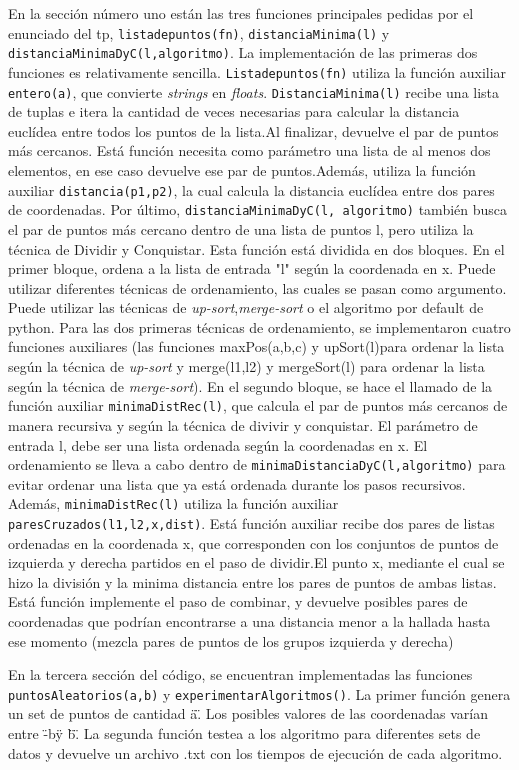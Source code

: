 \documentclass[12pt,a4paper]{article}
\begin{document}
En la sección número uno están las tres funciones principales pedidas por el enunciado del tp, \texttt{listadepuntos(fn)}, \texttt{distanciaMinima(l)} y \texttt{distanciaMinimaDyC(l,algoritmo)}. La implementación de las primeras dos funciones es relativamente sencilla. \texttt{Listadepuntos(fn)} utiliza la función auxiliar \texttt{entero(a)}, que convierte \textit{strings} en \textit{floats}. \texttt{DistanciaMinima(l)} recibe una lista de tuplas e itera la cantidad de veces necesarias para calcular la distancia euclídea entre todos los puntos de la lista.Al finalizar, devuelve el par de puntos más cercanos. Está función necesita como parámetro una lista de al menos dos elementos, en ese caso devuelve ese par de puntos.Además, utiliza la función auxiliar \texttt{distancia(p1,p2)}, la cual calcula la distancia euclídea entre dos pares de coordenadas. Por último, \texttt{distanciaMinimaDyC(l, algoritmo)} también busca el par de puntos más cercano dentro de una lista de puntos l, pero utiliza la técnica de Dividir y Conquistar. Esta función está dividida en dos bloques. En el primer bloque, ordena a la lista de entrada "l" según la coordenada en x. Puede utilizar diferentes técnicas de ordenamiento, las cuales se pasan como argumento. Puede utilizar las técnicas de \textit{up-sort},\textit{merge-sort} o el algoritmo por default de python. Para las dos primeras técnicas de ordenamiento, se implementaron cuatro funciones auxiliares (las funciones maxPos(a,b,c) y upSort(l)para ordenar la lista según la técnica de \textit{up-sort} y  merge(l1,l2) y mergeSort(l) para ordenar la lista según la técnica de \textit{merge-sort}). En el segundo bloque, se hace el llamado de la función auxiliar \texttt{minimaDistRec(l)}, que calcula el par de puntos más cercanos de manera recursiva y según la técnica de divivir y conquistar. El parámetro de entrada l, debe ser una lista ordenada según la coordenadas en x. El ordenamiento se lleva a cabo dentro de \texttt{minimaDistanciaDyC(l,algoritmo)} para evitar ordenar una lista que ya está ordenada durante los pasos recursivos. Además, \texttt{minimaDistRec(l)} utiliza la función auxiliar \texttt{paresCruzados(l1,l2,x,dist)}. Está función auxiliar recibe dos pares de listas ordenadas en la coordenada x, que corresponden con los conjuntos de puntos de izquierda y derecha partidos en el paso de dividir.El punto x, mediante el cual se hizo la división y la minima distancia entre los pares de puntos de ambas listas. Está función implemente el paso de combinar, y devuelve posibles pares de coordenadas que podrían encontrarse a una distancia menor a la hallada hasta ese momento (mezcla pares de puntos de los grupos izquierda y derecha)\par 
En la tercera sección del código, se encuentran implementadas las funciones \texttt{puntosAleatorios(a,b)} y \texttt{experimentarAlgoritmos()}. La primer función genera un set de puntos de cantidad \"a\". Los posibles valores de las coordenadas varían  entre \"-b\" y \"b\". La segunda función testea a los algoritmo para diferentes sets de datos y devuelve un archivo .txt con los tiempos de ejecución de cada algoritmo. \par 
\end{document}
